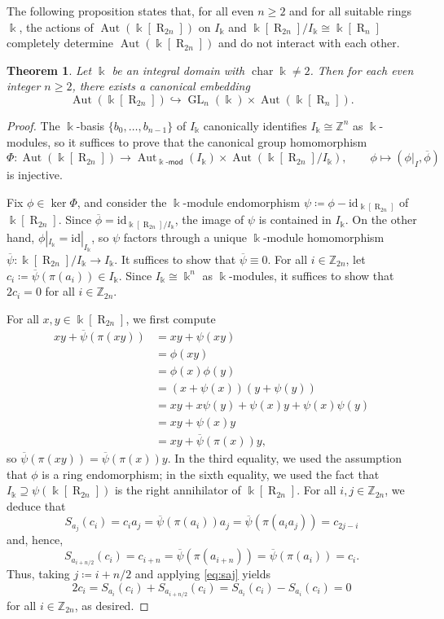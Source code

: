 \documentclass[12 pt]{amsart}
\newtheorem{theorem}{Theorem}[section]
\theoremstyle{definition}
\theoremstyle{remark}
\numberwithin{equation}{section}
\newcommand{\Aut}{\operatorname{Aut}}
\newcommand{\R}{\operatorname{R}}
\newcommand{\GL}{\operatorname{GL}}
\newcommand{\Z}{\mathbb{Z}}
\newcommand{\id}{\mathrm{id}}
\renewcommand{\k}{\Bbbk}
\newcommand{\chara}{\operatorname{char}}
\begin{document}
    The following proposition states that, for all even $n\geq 2$ and for all suitable rings $\k$, the actions of $\Aut(\k[\R_{2n}])$ on $I_\k$ and $\k[\R_{2n}]/I_\k\cong\k[\R_n]$ completely determine $\Aut(\k[\R_{2n}])$ and do not interact with each other.

\begin{theorem}\label{prop:embedding}
    Let $\k$ be an integral domain with $\chara\k\neq 2$. Then for each even integer $n\geq 2$, there exists a canonical embedding
    \[
    \Aut(\k[\R_{2n}])\hookrightarrow\GL_n(\k)\times\Aut(\k[\R_n]). 
    \]
\end{theorem}

\begin{proof}
    The $\k$-basis $\{b_0,\dots,b_{n-1}\}$ of $I_\k$ canonically identifies $I_\k\cong\Z^n$ as $\k$-modules, so it suffices to prove that the canonical group homomorphism
    \[
    \Phi\colon \Aut(\k[\R_{2n}])\to \Aut_{\k\text{-}\mathsf{mod}}(I_\k)\times \Aut(\k[\R_{2n}]/I_\k),\qquad\phi\mapsto(\phi|_I,\overline{\phi})
    \]
    is injective. 
    
    Fix $\phi\in\ker\Phi$, and consider the $\k$-module endomorphism $\psi\coloneq\phi-\id_{\k[\R_{2n}]}$ of $\k[\R_{2n}]$. Since $\overline{\phi}=\id_{\k[\R_{2n}]/I_\k}$, the image of $\psi$ is contained in $I_\k$. On the other hand, $\phi|_{I_\k}=\id|_{I_\k}$, so $\psi$ factors through a unique $\k$-module homomorphism $\overline{\psi}\colon\k[\R_{2n}]/I_\k\to I_\k$. 
    It suffices to show that $\overline\psi\equiv 0$. For all $i\in\Z_{2n}$, let $c_i\coloneq\overline\psi(\pi(a_i))\in I_\k$. Since $I_\k\cong\k^n$ as $\k$-modules, it suffices to show that $2c_i=0$ for all $i\in\Z_{2n}$. 
    
    For all $x,y\in\k[\R_{2n}]$, we first compute
    \begin{align*}
        xy+\overline\psi(\pi(xy))&=xy+\psi(xy)\\
        &=\phi(xy)\\
        &=\phi(x)\phi(y)\\
        &=(x+\psi(x))(y+\psi(y))\\
        &=xy+x\psi(y)+\psi(x)y+\psi(x)\psi(y)\\
        &=xy+\psi(x)y\\
        &=xy+\overline\psi(\pi(x))y,
    \end{align*}
    so $\overline\psi(\pi(xy))=\overline\psi(\pi(x))y$. In the third equality, we used the assumption that $\phi$ is a ring endomorphism; in the sixth equality, we used the fact that $I_\k\supseteq\psi(\k[\R_{2n}])$ is the right annihilator of $\k[\R_{2n}]$. For all $i,j\in\Z_{2n}$, we deduce that
    \[
    S_{a_j}(c_i)=c_ia_j=\overline\psi(\pi(a_i))a_j=\overline\psi(\pi(a_ia_j))=c_{2j-i}
    \]
    and, hence,
    \[
    S_{a_{i+n/2}}(c_i)=c_{i+n}=\overline\psi(\pi(a_{i+n}))=\overline\psi(\pi(a_i))=c_i.
    \]
    Thus, taking $j\coloneq i+n/2$ and applying \eqref{eq:saj} yields
    \[2c_i=S_{a_i}(c_i)+S_{a_{i+n/2}}(c_i)=S_{a_i}(c_i)-S_{a_i}(c_i)=0\]
    for all $i\in\Z_{2n}$, as desired.
\end{proof}
\end{document}
